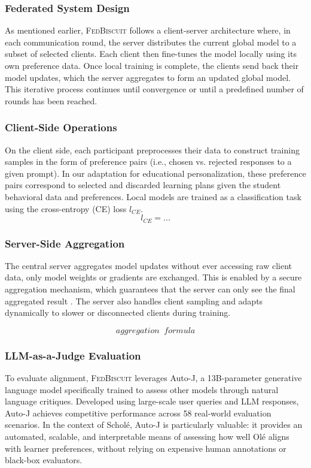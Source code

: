 \documentclass[sigconf]{acmart}
\begin{document}
\subsubsection{Federated System Design} 
As mentioned earlier, \textsc{FedBiscuit} follows a client-server architecture where, in each communication round, the server distributes the current global model to a subset of selected clients. Each client then fine-tunes the model locally using its own preference data. Once local training is complete, the clients send back their model updates, which the server aggregates to form an updated global model. This iterative process continues until convergence or until a predefined number of rounds has been reached.

\subsubsection{Client-Side Operations} 
On the client side, each participant preprocesses their data to construct training samples in the form of preference pairs (i.e., chosen vs. rejected responses to a given prompt). In our adaptation for educational personalization, these preference pairs correspond to selected and discarded learning plans given the student behavioral data and preferences. Local models are trained as a classification task using the cross-entropy (CE) loss $l_{CE}$.
\begin{equation}
	l_{CE}= ...
\end{equation}

\subsubsection{Server-Side Aggregation} 
The central server aggregates model updates without ever accessing raw client data, only model weights or gradients are exchanged. This is enabled by a secure aggregation mechanism, which guarantees that the server can only see the final aggregated result \cite{bonawitz2016practicalsecureaggregationfederated}. The server also handles client sampling and adapts dynamically to slower or disconnected clients during training.

\begin{equation}
	aggregation \;\; formula
\end{equation}

\subsubsection{LLM-as-a-Judge Evaluation} 
To evaluate alignment, \textsc{FedBiscuit} leverages Auto-J, a 13B-parameter generative language model specifically trained to assess other models through natural language critiques. Developed using large-scale user queries and LLM responses, Auto-J achieves competitive performance across 58 real-world evaluation scenarios. In the context of Schol\'e, Auto-J is particularly valuable: it provides an automated, scalable, and interpretable means of assessing how well Ol\'e aligns with learner preferences, without relying on expensive human annotations or black-box evaluators.
\end{document}
